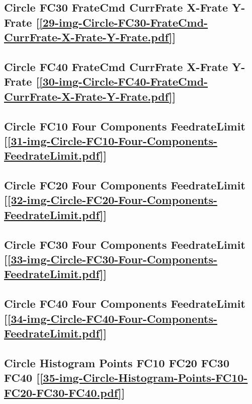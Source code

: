 \subsection       {Circle FC30 FrateCmd CurrFrate X-Frate Y-Frate
[\ref      {29-img-Circle-FC30-FrateCmd-CurrFrate-X-Frate-Y-Frate.pdf}] }
\label{ssec-29-img-Circle-FC30-FrateCmd-CurrFrate-X-Frate-Y-Frate.pdf}

\subsection       {Circle FC40 FrateCmd CurrFrate X-Frate Y-Frate
[\ref      {30-img-Circle-FC40-FrateCmd-CurrFrate-X-Frate-Y-Frate.pdf}] }
\label{ssec-30-img-Circle-FC40-FrateCmd-CurrFrate-X-Frate-Y-Frate.pdf}

\subsection       {Circle FC10 Four Components FeedrateLimit
[\ref      {31-img-Circle-FC10-Four-Components-FeedrateLimit.pdf}] }
\label{ssec-31-img-Circle-FC10-Four-Components-FeedrateLimit.pdf}

\subsection       {Circle FC20 Four Components FeedrateLimit
[\ref      {32-img-Circle-FC20-Four-Components-FeedrateLimit.pdf}] }
\label{ssec-32-img-Circle-FC20-Four-Components-FeedrateLimit.pdf}

\subsection       {Circle FC30 Four Components FeedrateLimit
[\ref      {33-img-Circle-FC30-Four-Components-FeedrateLimit.pdf}] }
\label{ssec-33-img-Circle-FC30-Four-Components-FeedrateLimit.pdf}

\subsection       {Circle FC40 Four Components FeedrateLimit
[\ref      {34-img-Circle-FC40-Four-Components-FeedrateLimit.pdf}]}
\label{ssec-34-img-Circle-FC40-Four-Components-FeedrateLimit.pdf}

\subsection       {Circle Histogram Points FC10 FC20 FC30 FC40
[\ref       {35-img-Circle-Histogram-Points-FC10-FC20-FC30-FC40.pdf}] }
\label{ssec-35-img-Circle-Histogram-Points-FC10-FC20-FC30-FC40.pdf}

